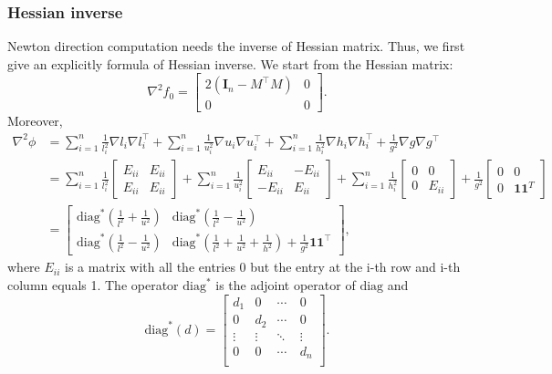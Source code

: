 \documentclass[final,onefignum,onetabnum]{siamart190516}
\begin{document}
\subsubsection{Hessian inverse}
Newton direction computation needs the inverse of Hessian matrix. Thus, we first give an explicitly formula of Hessian inverse. We start from the Hessian matrix:
\begin{equation}
    \nabla^2 f_0 = \begin{bmatrix} 2(\mathbf{I}_n-M^\top M) &0\\0 &0\end{bmatrix}.
\end{equation}
Moreover,
\begin{equation}
\begin{aligned}
    \nabla^2 \phi &= \sum_{i=1}^n
\frac{1}{l_i^2}\nabla l_i\nabla l_i^\top + \sum_{i=1}^n
\frac{1}{u_i^2}\nabla u_i\nabla u_i^\top + \sum_{i=1}^n
\frac{1}{h_i^2}\nabla h_i\nabla h_i^\top + \frac{1}{g^2} \nabla g\nabla g^\top\\
&= \sum_{i=1}^n
\frac{1}{l_i^2}\begin{bmatrix} E_{ii} & E_{ii}\\ E_{ii} &E_{ii}\end{bmatrix} + \sum_{i=1}^n
\frac{1}{u_i^2}\begin{bmatrix} E_{ii} & -E_{ii}\\ -E_{ii} &E_{ii}\end{bmatrix} + \sum_{i=1}^n
\frac{1}{h_i^2}\begin{bmatrix} 0 & 0\\ 0 &E_{ii}\end{bmatrix} + \frac{1}{g^2} \begin{bmatrix} 0 & 0\\ 0 &\mathbf{1}\mathbf{1}^T\end{bmatrix}\\
&=\begin{bmatrix} \text{diag}^*(\frac{1}{l^2}+\frac{1}{u^2}) &  \text{diag}^*(\frac{1}{l^2}-\frac{1}{u^2})\\
\text{diag}^*(\frac{1}{l^2}-\frac{1}{u^2}) & \text{diag}^*(\frac{1}{l^2}+\frac{1}{u^2}+\frac{1}{h^2}) + \frac{1}{g^2}\mathbf{1}\mathbf{1}^\top\end{bmatrix},
\end{aligned}
\end{equation}
where $E_{ii}$ is a matrix with all the entries 0 but the entry at the i-th row and i-th column equals 1. The operator $\text{diag}^*$ is the adjoint operator of $\text{diag}$ and
\begin{equation}
    \text{diag}^*(d)=\begin{bmatrix}
d_1 & 0  & \cdots   & 0   \\
0 & d_2  & \cdots   & 0  \\
\vdots & \vdots  & \ddots   & \vdots  \\
0 & 0  & \cdots\  & d_n  \\
\end{bmatrix}.
\end{equation}
\end{document}
